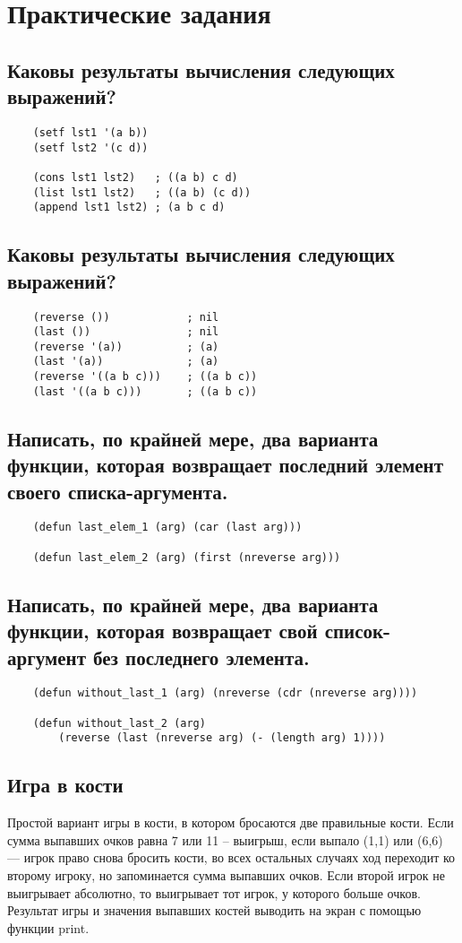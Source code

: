 \chapter{Практические задания}
\section{Каковы результаты вычисления следующих выражений?}
\begin{lstlisting}
	(setf lst1 '(a b))
	(setf lst2 '(c d))
	
	(cons lst1 lst2)   ; ((a b) c d) 
	(list lst1 lst2)   ; ((a b) (c d))
	(append lst1 lst2) ; (a b c d)
\end{lstlisting}
\section{Каковы результаты вычисления следующих выражений?}
\begin{lstlisting}
	(reverse ()) 			; nil
	(last ())				; nil
	(reverse '(a))			; (a)
	(last '(a))				; (a)
	(reverse '((a b c)))	; ((a b c))
	(last '((a b c)))		; ((a b c))
\end{lstlisting}

\section{Написать, по крайней мере, два варианта функции, которая возвращает последний элемент своего списка-аргумента.}
\begin{lstlisting}
	(defun last_elem_1 (arg) (car (last arg)))
	
	(defun last_elem_2 (arg) (first (nreverse arg)))
\end{lstlisting}

\section{Написать, по крайней мере, два варианта функции, которая возвращает свой список-аргумент без последнего элемента.}
\begin{lstlisting}
	(defun without_last_1 (arg) (nreverse (cdr (nreverse arg))))
	
	(defun without_last_2 (arg) 
		(reverse (last (nreverse arg) (- (length arg) 1))))
\end{lstlisting}

\section{Игра в кости}
Простой вариант игры в кости, в котором бросаются две правильные кости. Если
сумма выпавших очков равна 7 или 11 -- выигрыш, если выпало (1,1) или (6,6) --- игрок право снова бросить кости, во всех остальных случаях ход переходит ко второму игроку, но запоминается сумма выпавших очков. Если второй игрок не выигрывает абсолютно, то выигрывает тот игрок, у которого больше очков. Результат игры и значения выпавших костей выводить на экран с помощью функции print.

